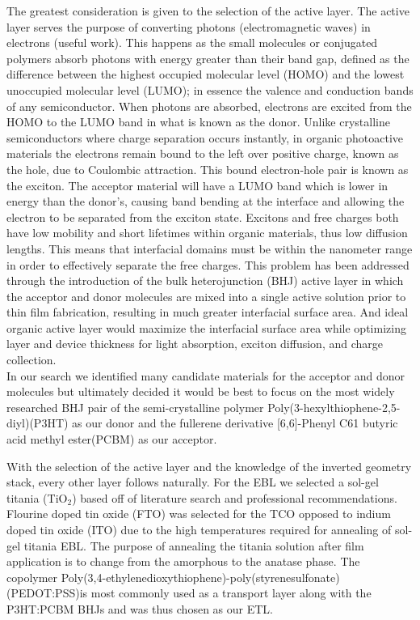 	
	The greatest consideration is given to the selection of the active layer. The active layer serves the purpose of converting photons (electromagnetic waves) in electrons (useful work). This happens as the small molecules or conjugated polymers absorb photons with energy greater than their band gap, defined as the difference between the highest occupied molecular level (HOMO) and the lowest unoccupied molecular level (LUMO); in essence the valence and conduction bands of any semiconductor. When photons are absorbed, electrons are excited from the HOMO to the LUMO band in what is known as the donor. Unlike crystalline semiconductors where charge separation occurs instantly, in organic photoactive materials the electrons remain bound to the left over positive charge, known as the hole, due to Coulombic attraction. This bound electron-hole pair is known as the exciton. The acceptor material will have a LUMO band which is lower in energy than the donor's, causing band bending at the interface and allowing the electron to be separated from the exciton state. Excitons and free charges both have low mobility and short lifetimes within organic materials, thus low diffusion lengths. This means that interfacial domains must be within the nanometer range in order to effectively separate the free charges. This problem has been addressed through the introduction of the bulk heterojunction (BHJ) active layer in which the acceptor and donor molecules are mixed into a single active solution prior to thin film fabrication, resulting in much greater interfacial surface area. And ideal organic active layer would maximize the interfacial surface area while optimizing layer and device thickness for light absorption, exciton diffusion, and charge collection.\\
	
	In our search we identified many candidate materials for the acceptor and donor molecules but ultimately decided it would be best to focus on the most widely researched BHJ pair of the semi-crystalline polymer Poly(3-hexylthiophene-2,5-diyl)(P3HT) as our donor and the fullerene derivative [6,6]-Phenyl C61 butyric acid methyl ester(PCBM) as our acceptor.\\
	
	
	With the selection of the active layer and the knowledge of the inverted geometry stack, every other layer follows naturally. For the EBL we selected a sol-gel titania (TiO$_2$) based off of literature search and professional recommendations. Flourine doped tin oxide (FTO) was selected for the TCO opposed to indium doped tin oxide (ITO) due to the high temperatures required for annealing of sol-gel titania EBL. The purpose of annealing the titania solution after film application is to change from the amorphous to the anatase phase. The copolymer Poly(3,4-ethylenedioxythiophene)-poly(styrenesulfonate) (PEDOT:PSS)is most commonly used as a transport layer along with the P3HT:PCBM BHJs and was thus chosen as our ETL.
	
